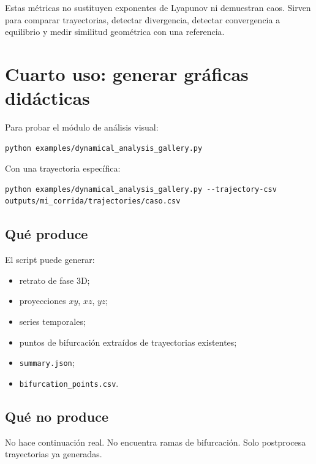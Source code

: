 \documentclass[11pt,letterpaper]{article}
\begin{document}
\begin{advertencia}
Estas métricas no sustituyen exponentes de Lyapunov ni demuestran caos. Sirven para comparar trayectorias, detectar divergencia, detectar convergencia a equilibrio y medir similitud geométrica con una referencia.
\end{advertencia}

\section{Cuarto uso: generar gráficas didácticas}

Para probar el módulo de análisis visual:

\begin{lstlisting}[style=terminal]
python examples/dynamical_analysis_gallery.py
\end{lstlisting}

Con una trayectoria específica:

\begin{lstlisting}[style=terminal]
python examples/dynamical_analysis_gallery.py --trajectory-csv outputs/mi_corrida/trajectories/caso.csv
\end{lstlisting}

\subsection{Qué produce}

El script puede generar:

\begin{itemize}
  \item retrato de fase 3D;
  \item proyecciones $xy$, $xz$, $yz$;
  \item series temporales;
  \item puntos de bifurcación extraídos de trayectorias existentes;
  \item \texttt{summary.json};
  \item \texttt{bifurcation\_points.csv}.
\end{itemize}

\subsection{Qué no produce}

No hace continuación real. No encuentra ramas de bifurcación. Solo postprocesa trayectorias ya generadas.
\end{document}
